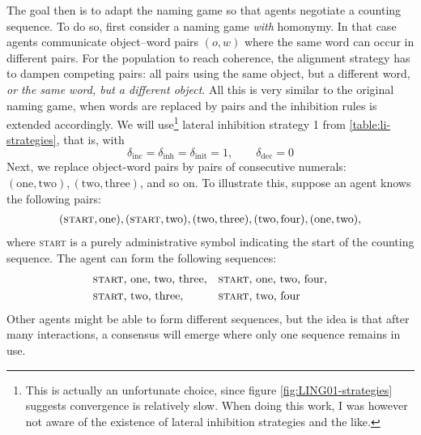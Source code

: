 \documentclass{../src/bcthesispart}
\begin{document}
The goal then is to adapt the naming game so that agents negotiate a counting sequence.
To do so, first consider a naming game \emph{with} homonymy.  
In that case agents communicate object--word pairs $(o,w)$ where the same word can occur in different pairs.
For the population to reach coherence, the alignment strategy has to dampen competing pairs: all pairs using the same object, but a different word, \emph{or the same word, but a different object}.
All this is very similar to the original naming game, when words are replaced by pairs and the inhibition rules is extended accordingly.
We will use\footnote{%
	This is actually an unfortunate choice, since figure \ref{fig:LING01-strategies} suggests convergence is relatively slow.
	When doing this work, I was however not aware of the existence of lateral inhibition strategies and the like.
} lateral inhibition strategy 1 from \ref{table:li-strategies}, that is, with
\begin{equation}
	\delta_{\text{inc}} 
		= \delta_{\text{inh}} 
		= \delta_{\text{init}} 
		= 1,
	\qquad
	\delta_{\text{dec}} = 0
\end{equation}
Next, we replace object-word pairs by pairs of consecutive numerals: $(\text{one}, \text{two}), (\text{two}, \text{three})$, and so on. 
To illustrate this, suppose an agent knows the following pairs:
\begin{align*}
	(\textsc{start}, \text{one}), 
	(\textsc{start}, \text{two}), 
	(\text{two}, \text{three}),
	(\text{two}, \text{four}),
	(\text{one}, \text{two}),
\end{align*}
where \textsc{start} is a purely administrative symbol indicating the start of the counting sequence. The agent can form the following sequences:
\begin{align*}
	&\text{\textsc{start}, one, two, three},
	&&\text{\textsc{start}, one, two, four},\\
	&\text{\textsc{start}, two, three},
	&&\text{\textsc{start}, two, four}
\end{align*}
Other agents might be able to form different sequences, but the idea is that after many interactions, a consensus will emerge where only one sequence remains in use.
\end{document}
